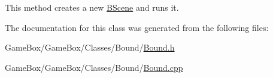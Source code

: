 \-This method creates a new \hyperlink{class_b_scene}{\-B\-Scene} and runs it. 



\-The documentation for this class was generated from the following files\-:\begin{DoxyCompactItemize}
\item 
\-Game\-Box/\-Game\-Box/\-Classes/\-Bound/\hyperlink{_bound_8h}{\-Bound.\-h}\item 
\-Game\-Box/\-Game\-Box/\-Classes/\-Bound/\hyperlink{_bound_8cpp}{\-Bound.\-cpp}\end{DoxyCompactItemize}
